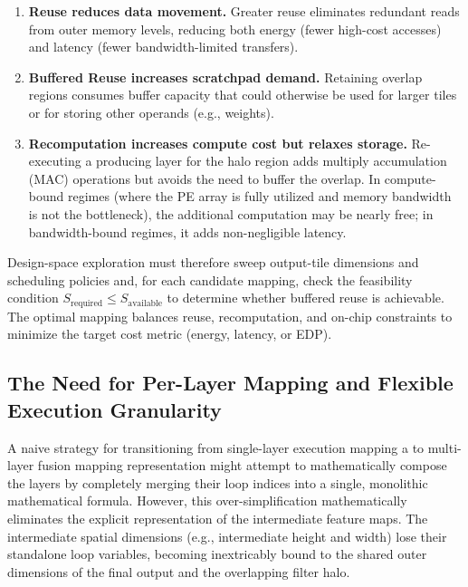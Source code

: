 \begin{enumerate}
  \item \textbf{Reuse reduces data movement.}
        Greater reuse eliminates redundant reads from outer memory
        levels, reducing both energy (fewer high-cost accesses) and
        latency (fewer bandwidth-limited transfers).

  \item \textbf{Buffered Reuse increases scratchpad demand.}
        Retaining overlap regions consumes buffer capacity that could
        otherwise be used for larger tiles or for storing other
        operands (e.g., weights).

  \item \textbf{Recomputation increases compute cost but relaxes
        storage.}
        Re-executing a producing layer for the halo region adds  multiply accumulation (MAC)
        operations but avoids the need to buffer the overlap.
        In compute-bound regimes (where the PE array is fully
        utilized and memory bandwidth is not the bottleneck), the
        additional computation may be nearly free; in
        bandwidth-bound regimes, it adds non-negligible latency.
\end{enumerate}

Design-space exploration must therefore sweep output-tile dimensions
and scheduling policies and, for each candidate mapping, check the
feasibility condition $S_{\text{required}} \le S_{\text{available}}$
to determine whether buffered reuse is achievable.
The optimal mapping balances reuse, recomputation, and on-chip
constraints to minimize the target cost metric (energy, latency, or
EDP).

\subsection{The Need for Per-Layer Mapping and Flexible Execution Granularity}
\label{sec:fds-per-layer-mapping}

A naive strategy for transitioning from single-layer execution mapping a to multi-layer fusion mapping representation might attempt to mathematically compose the layers by completely merging their loop indices into a single, monolithic mathematical formula. However, this over-simplification mathematically eliminates the explicit representation of the intermediate feature maps. The intermediate spatial dimensions (e.g., intermediate height and width) lose their standalone loop variables, becoming inextricably bound to the shared outer dimensions of the final output and the overlapping filter halo. 

